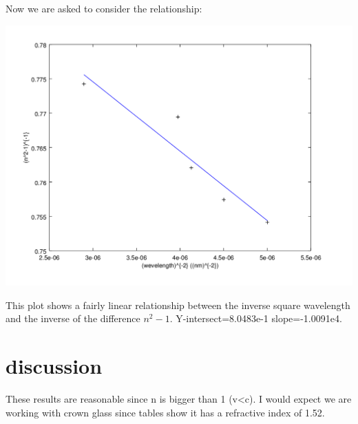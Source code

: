 \documentclass[12pt,a4paper]{article}
\begin{document}
Now we are asked to consider the relationship:

\includegraphics[scale=.3]{plot}





This plot shows a fairly linear relationship between the inverse square wavelength and the inverse of the difference $n^2-1$.  Y-intersect=8.0483e-1 slope=-1.0091e4.

\section{discussion}
These results are reasonable since n is bigger than 1 (v<c).  I would expect we are working with crown glass since tables show it has a refractive index of 1.52.
\end{document}
